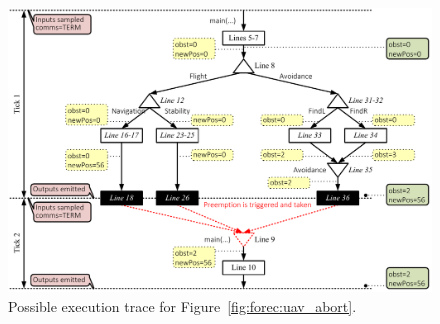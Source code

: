 \begin{figure}
	\centering

	\includegraphics[width=\columnwidth]{images/uav_timing2.pdf}

	\caption{Possible execution trace for Figure~\ref{fig:forec:uav_abort}.}
	\label{fig:forec:uav_timing2}
\end{figure}


